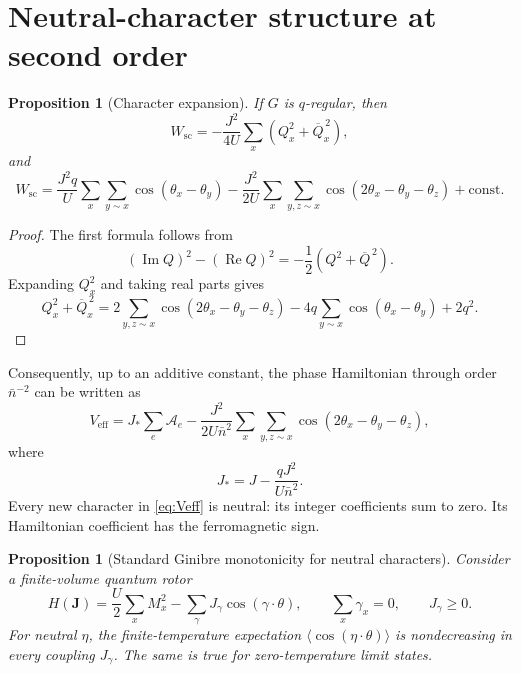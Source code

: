 \documentclass[11pt]{article}
\newtheorem{proposition}[theorem]{Proposition}
\newcommand{\nbar}{\bar n}
\newcommand{\cA}{\mathcal A}
\begin{document}
\section{Neutral-character structure at second order}
\label{sec:characters}

\begin{proposition}[Character expansion]
If $G$ is $q$-regular, then
\begin{equation}
W_{\mathrm{sc}}
=-\frac{J^2}{4U}\sum_x(Q_x^2+\overline{Q}_x^{\,2}),
\label{eq:WscQ}
\end{equation}
and
\begin{equation}
W_{\mathrm{sc}}
=\frac{J^2q}{U}\sum_x\sum_{y\sim x}\cos(\theta_x-\theta_y)
-\frac{J^2}{2U}\sum_x\sum_{y,z\sim x}\cos(2\theta_x-\theta_y-\theta_z)
+\mathrm{const}.
\label{eq:Wsccharacters}
\end{equation}
\end{proposition}

\begin{proof}
The first formula follows from
\[
(\operatorname{Im}Q)^2-(\operatorname{Re}Q)^2
=-\frac12(Q^2+\overline Q^{\,2}).
\]
Expanding $Q_x^2$ and taking real parts gives
\[
Q_x^2+\overline Q_x^{\,2}
=2\sum_{y,z\sim x}\cos(2\theta_x-\theta_y-\theta_z)
-4q\sum_{y\sim x}\cos(\theta_x-\theta_y)
+2q^2.
\]
\end{proof}

Consequently, up to an additive constant, the phase Hamiltonian through order $\nbar^{-2}$ can be written as
\begin{equation}
V_{\mathrm{eff}}
=J_*\sum_e\cA_e
-\frac{J^2}{2U\nbar^2}
\sum_x\sum_{y,z\sim x}\cos(2\theta_x-\theta_y-\theta_z),
\label{eq:Veff}
\end{equation}
where
\begin{equation}
J_*=J-\frac{qJ^2}{U\nbar^2}.
\label{eq:Jstar}
\end{equation}
Every new character in \eqref{eq:Veff} is neutral: its integer coefficients sum to zero. Its Hamiltonian coefficient has the ferromagnetic sign.

\begin{proposition}[Standard Ginibre monotonicity for neutral characters]
Consider a finite-volume quantum rotor
\begin{equation}
H(\bm J)
=\frac U2\sum_xM_x^2
-\sum_\gamma J_\gamma\cos(\gamma\cdot\theta),
\qquad
\sum_x\gamma_x=0,
\qquad
J_\gamma\ge0.
\label{eq:ginibresetup}
\end{equation}
For neutral $\eta$, the finite-temperature expectation
$\langle\cos(\eta\cdot\theta)\rangle$ is nondecreasing in every coupling $J_\gamma$. The same is true for zero-temperature limit states.
\end{proposition}
\end{document}
